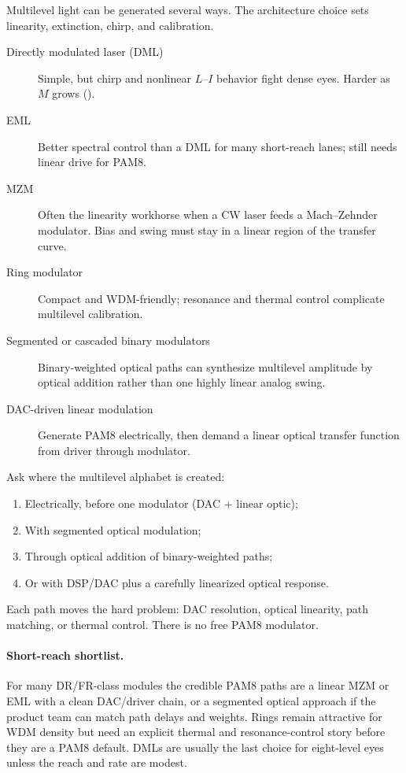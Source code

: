 Multilevel light can be generated several ways. The architecture choice sets
linearity, extinction, chirp, and calibration.

\begin{description}
\item[Directly modulated laser (DML)] Simple, but chirp and nonlinear
      \(L\)--\(I\) behavior fight dense eyes. Harder as \(M\) grows
      ().
\item[EML] Better spectral control than a DML for many short-reach lanes; still
      needs linear drive for PAM8.
\item[MZM] Often the linearity workhorse when a CW laser feeds a Mach--Zehnder
      modulator. Bias and swing must stay in a linear region of the transfer
      curve.
\item[Ring modulator] Compact and WDM-friendly; resonance and thermal control
      complicate multilevel calibration.
\item[Segmented or cascaded binary modulators] Binary-weighted optical paths
      can synthesize multilevel amplitude by optical addition rather than one
      highly linear analog swing.
\item[DAC-driven linear modulation] Generate PAM8 electrically, then demand a
      linear optical transfer function from driver through modulator.
\end{description}

Ask where the multilevel alphabet is created:

\begin{enumerate}
\item Electrically, before one modulator (DAC + linear optic);
\item With segmented optical modulation;
\item Through optical addition of binary-weighted paths;
\item Or with DSP/DAC plus a carefully linearized optical response.
\end{enumerate}

Each path moves the hard problem: DAC resolution, optical linearity, path
matching, or thermal control. There is no free PAM8 modulator.

\paragraph{Short-reach shortlist.}
For many DR/FR-class modules the credible PAM8 paths are a linear MZM or EML
with a clean DAC/driver chain, or a segmented optical approach if the product
team can match path delays and weights. Rings remain attractive for WDM density
but need an explicit thermal and resonance-control story before they are a PAM8
default. DMLs are usually the last choice for eight-level eyes unless the reach
and rate are modest.

